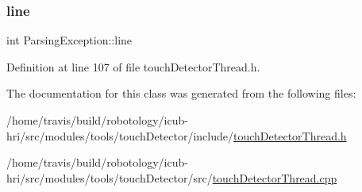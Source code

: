 \subsubsection{\texorpdfstring{line}{line}}
{\footnotesize\ttfamily int Parsing\+Exception\+::line}



Definition at line 107 of file touch\+Detector\+Thread.\+h.



The documentation for this class was generated from the following files\+:\begin{DoxyCompactItemize}
\item 
/home/travis/build/robotology/icub-\/hri/src/modules/tools/touch\+Detector/include/\hyperlink{touchDetectorThread_8h}{touch\+Detector\+Thread.\+h}\item 
/home/travis/build/robotology/icub-\/hri/src/modules/tools/touch\+Detector/src/\hyperlink{touchDetectorThread_8cpp}{touch\+Detector\+Thread.\+cpp}\end{DoxyCompactItemize}
